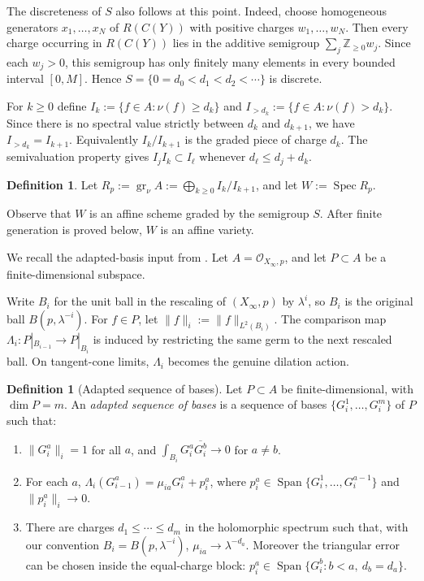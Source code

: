 \documentclass[11pt]{amsart}
\theoremstyle{definition}
\newtheorem{definition}[theorem]{Definition}
\theoremstyle{remark}
\begin{document}
The discreteness of $S$ also follows at this point. Indeed, choose homogeneous
generators $x_1,\dots,x_N$ of $R(C(Y))$ with positive charges $w_1,\dots,w_N$.
Then every charge occurring in $R(C(Y))$ lies in the additive semigroup
$\sum_j\mathbb Z_{\geq0}w_j$. Since each $w_j>0$, this semigroup has only
finitely many elements in every bounded interval $[0,M]$. Hence
$S=\{0=d_0<d_1<d_2<\cdots\}$ is discrete.

For $k\geq0$ define $I_k:=\{f\in A:\nu(f)\geq d_k\}$ and $I_{>d_k}:=\{f\in A:\nu(f)>d_k\}$.
Since there is no spectral value strictly between $d_k$ and $d_{k+1}$, we have
$I_{>d_k}=I_{k+1}$. Equivalently $I_k/I_{k+1}$ is the graded piece of charge
$d_k$. The semivaluation property gives $I_jI_k\subset I_\ell$ whenever
$d_\ell\leq d_j+d_k$.

\begin{definition}
Let $R_p:=\operatorname{gr}_\nu A:=\bigoplus_{k\geq0}I_k/I_{k+1}$, and let
$W:=\operatorname{Spec}R_p$.
\end{definition}

Observe that $W$ is an affine scheme graded by the semigroup $S$. After finite
generation is proved below, $W$ is an affine variety.

We recall the adapted-basis input from \cite[Section~3.2]{DSII}. Let
$A=\mathcal O_{X_\infty,p}$, and let $P\subset A$ be a finite-dimensional
subspace. 

Write $B_i$ for the unit ball in the rescaling of $(X_\infty,p)$ by
$\lambda^i$, so $B_i$ is the original ball $B(p,\lambda^{-i})$. For
$f\in P$, let $\|f\|_i:=\|f\|_{L^2(B_i)}$. The comparison map
$\Lambda_i:P|_{B_{i-1}}\to P|_{B_i}$ is induced by restricting the same germ to
the next rescaled ball. On tangent-cone limits, $\Lambda_i$ becomes the genuine
dilation action.

\begin{definition}[Adapted sequence of bases]
Let $P\subset A$ be finite-dimensional, with $\dim P=m$. An \emph{adapted
sequence of bases} is a sequence of bases
$\{G_i^1,\dots,G_i^m\}$ of $P$ such that:

\begin{enumerate}
\item $\|G_i^a\|_i=1$ for all $a$, and
$\int_{B_i}G_i^a\overline{G_i^b}\to0$ for $a\neq b$.

\item For each $a$,
$\Lambda_i(G_{i-1}^a)=\mu_{ia}G_i^a+p_i^a$, where
$p_i^a\in\operatorname{Span}\{G_i^1,\dots,G_i^{a-1}\}$ and
$\|p_i^a\|_i\to0$.

\item There are charges $d_1\leq\cdots\leq d_m$ in the holomorphic spectrum
such that, with our convention $B_i=B(p,\lambda^{-i})$,
$\mu_{ia}\to\lambda^{-d_a}$. Moreover the triangular error can be chosen inside
the equal-charge block:
$p_i^a\in\operatorname{Span}\{G_i^b:b<a,\ d_b=d_a\}$.
\end{enumerate}
\end{definition}
\end{document}
